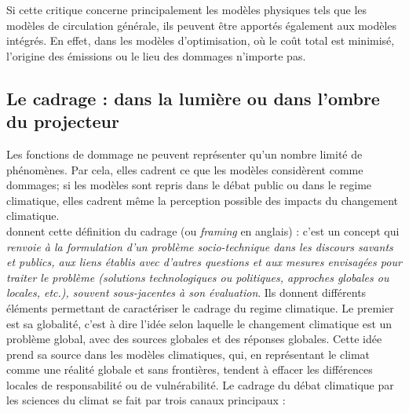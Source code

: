 Si cette critique concerne principalement les modèles physiques tels que les modèles de circulation générale, ils peuvent être apportés également aux modèles intégrés. En effet, dans les modèles d'optimisation, où le coût total est minimisé, l'origine des émissions ou le lieu des dommages n'importe pas.  


\subsection{Le cadrage : dans la lumière ou dans l'ombre du projecteur}
\label{ss:cadrage}

Les fonctions de dommage ne peuvent représenter qu'un nombre limité de phénomènes. Par cela, elles cadrent ce que les modèles considèrent comme dommages; si les modèles sont repris dans le débat public ou dans le \gls{regime climatique}, elles cadrent même la perception possible des impacts du changement climatique. \\

\textcite{aykut_gouverner_2015} donnent cette définition du cadrage (ou \emph{framing} en anglais) : c'est un concept qui  \emph{renvoie à la formulation d’un problème socio-technique dans les discours savants et publics, aux liens établis avec d’autres questions et aux mesures envisagées pour traiter le problème (solutions technologiques ou politiques, approches globales ou locales, etc.), souvent sous-jacentes à son évaluation}. Ils donnent différents éléments permettant de caractériser le cadrage du \gls{regime climatique}. Le premier est sa globalité, c'est à dire l'idée selon laquelle le changement climatique est un problème global, avec des sources globales et des réponses globales. Cette idée prend sa source dans les modèles climatiques, qui, en représentant le climat comme une réalité globale et sans frontières, tendent à effacer les différences locales de responsabilité ou de vulnérabilité. Le cadrage du débat climatique par les sciences du climat se fait par trois canaux principaux : 



